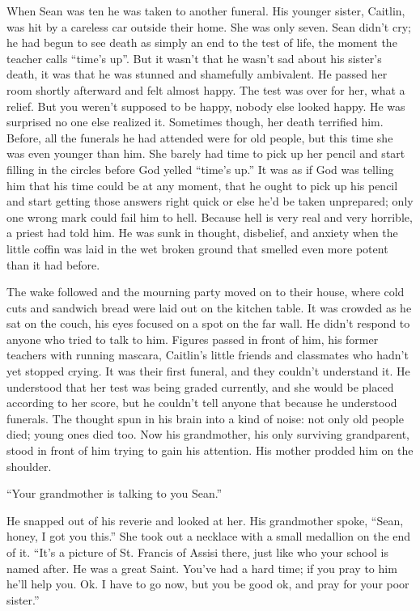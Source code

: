 \documentclass[12pt]{article}
\begin{document}
When Sean was ten he was taken to another funeral. His younger sister, Caitlin, was hit by a careless car outside their home. She was only seven. Sean didn’t cry; he had begun to see death as simply an end to the test of life, the moment the teacher calls “time’s up”. But it wasn’t that he wasn’t sad about his sister’s death, it was that he was stunned and shamefully ambivalent. He passed her room shortly afterward and felt almost happy. The test was over for her, what a relief. But you weren’t supposed to be happy, nobody else looked happy. He was surprised no one else realized it. Sometimes though, her death terrified him. Before, all the funerals he had attended were for old people, but this time she was even younger than him. She barely had time to pick up her pencil and start filling in the circles before God yelled “time’s up.” It was as if God was telling him that his time could be at any moment, that he ought to pick up his pencil and start getting those answers right quick or else he’d be taken unprepared; only one wrong mark could fail him to hell. Because hell is very real and very horrible, a priest had told him. He was sunk in thought, disbelief, and anxiety when the little coffin was laid in the wet broken ground that smelled even more potent than it had before.

The wake followed and the mourning party moved on to their house, where cold cuts and sandwich bread were laid out on the kitchen table. It was crowded as he sat on the couch, his eyes focused on a spot on the far wall. He didn’t respond to anyone who tried to talk to him.  Figures passed in front of him, his former teachers with running mascara, Caitlin’s little friends and classmates who hadn’t yet stopped crying. It was their first funeral, and they couldn’t understand it. He understood that her test was being graded currently, and she would be placed according to her score, but he couldn’t tell anyone that because he understood funerals. The thought spun in his brain into a kind of noise: not only old people died; young ones died too. Now his grandmother, his only surviving grandparent, stood in front of him trying to gain his attention. His mother prodded him on the shoulder.

“Your grandmother is talking to you Sean.”

He snapped out of his reverie and looked at her.  His grandmother spoke, “Sean, honey, I got you this.”  She took out a necklace with a small medallion on the end of it.  “It’s a picture of St. Francis of Assisi there, just like who your school is named after.  He was a great Saint.  You’ve had a hard time; if you pray to him he’ll help you. Ok.  I have to go now, but you be good ok, and pray for your poor sister.”
\end{document}
